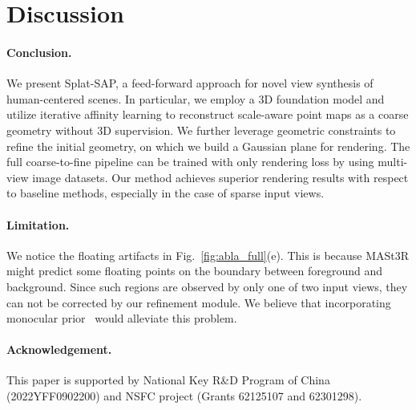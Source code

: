 \section{Discussion}
\paragraph{Conclusion.} We present Splat-SAP, a feed-forward approach for novel view synthesis of human-centered scenes.
%
In particular, we employ a 3D foundation model and utilize iterative affinity learning to reconstruct scale-aware point maps as a coarse geometry without 3D supervision.
%
We further leverage geometric constraints to refine the initial geometry, on which we build a Gaussian plane for rendering.
%
The full coarse-to-fine pipeline can be trained with only rendering loss by using multi-view image datasets.
%
Our method achieves superior rendering results with respect to baseline methods, especially in the case of sparse input views.

\paragraph{Limitation.} We notice the floating artifacts in Fig.~\ref{fig:abla_full}(e).
%
This is because MASt3R might predict some floating points on the boundary between foreground and background.
%
Since such regions are observed by only one of two input views, they can not be corrected by our refinement module.
%
We believe that incorporating monocular prior~\cite{xu2024depthsplat} would alleviate this problem.

\paragraph{Acknowledgement.} This paper is supported by National
Key R\&D Program of China (2022YFF0902200) and NSFC
project (Grants 62125107 and 62301298).